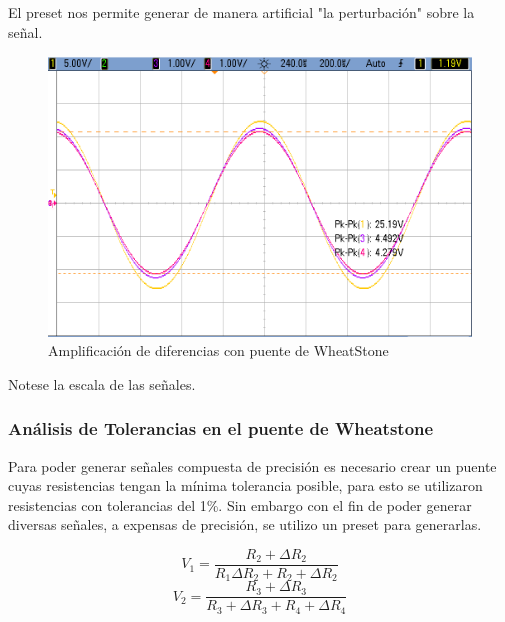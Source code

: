 El preset nos permite generar de manera artificial "la perturbación" sobre la señal.

\begin{figure}[H]
	\centering
	\includegraphics[height=0.3\textheight]{./ImagenesDeOsciloscopio/WheatStone1tierra1c1R.png}
	\caption{Amplificación de diferencias con puente de WheatStone}
\end{figure}
Notese la escala de las señales.
\subsubsection{Análisis de Tolerancias en el puente de Wheatstone}
Para poder generar señales compuesta de precisión es necesario crear un puente cuyas resistencias tengan la mínima tolerancia posible, para esto se utilizaron resistencias con tolerancias del 1\%. Sin embargo con el fin de poder generar diversas señales, a expensas de precisión, se utilizo un preset para generarlas.

\begin{equation}
V_1 = \frac{R_2+\Delta R_2}{R_1\Delta R_2+R_2+\Delta R_2}
\end{equation}
\begin{equation}
V_2 = \frac{R_3+\Delta R_3}
{R_3+\Delta R_3+R_4+\Delta R_4}
\end{equation}





